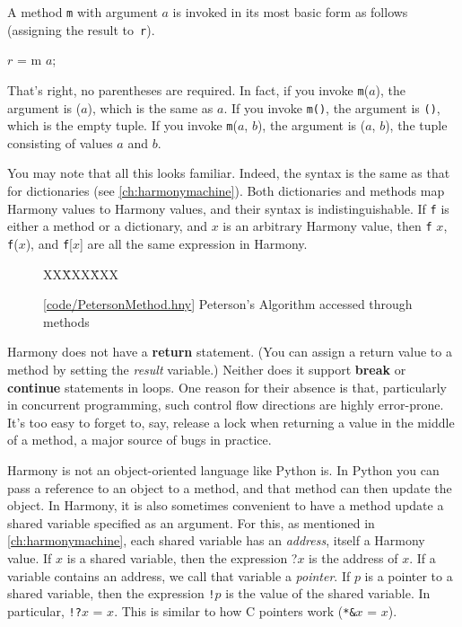 \documentclass{report}
\newcommand{\harmonysource}[1]{
\begin{tabbing}
XX\=XXX\=XXX\kill
    
\end{tabbing}
}
\newcommand{\harmonylink}[1]{%
[\href{https://harmony.cs.cornell.edu/#1}{\underline{#1}}]%
}
\newenvironment{code}{
\tcolorbox
}{
\endtcolorbox
}
\begin{document}
A method \texttt{m} with argument $a$ is invoked in its
most basic form as follows (assigning the result to~\texttt{r}).
\begin{code}
$r$ = m $a$;
\end{code}
That's right, no parentheses are required.  In fact, if you invoke
\texttt{m}($a$), the argument is ($a$), which is the same
as $a$.
If you invoke \texttt{m()}, the argument is \texttt{()},
which is the empty tuple.
If you invoke \texttt{m}($a$, $b$), the argument is ($a$, $b$),
the tuple consisting of values $a$ and $b$.

You may note that all this looks familiar.  Indeed, the syntax
is the same as that for dictionaries (see \autoref{ch:harmonymachine}).
Both dictionaries and methods map Harmony values to Harmony values,
and their syntax is indistinguishable.
If \texttt{f} is either a method or a
dictionary, and $x$ is an arbitrary Harmony value, then
\texttt{f} $x$, \texttt{f}($x$), and \texttt{f}[$x$] are all
the same expression in Harmony.

\begin{figure}
\begin{code}
\harmonysource{PetersonMethod}
\end{code}
\caption{\harmonylink{code/PetersonMethod.hny} Peterson's Algorithm accessed through methods}
\label{fig:petersonmethods}
\end{figure}

Harmony does not have a \textbf{return} statement.  (You can assign a return value
to a method by setting the \textit{result} variable.)  Neither does it support
\textbf{break} or \textbf{continue} statements in loops.  One reason for their absence is
that, particularly in concurrent programming, such control flow directions are highly
error-prone.  It's too easy to forget to, say, release a lock when returning a value in the
middle of a method, a major source of bugs in practice.

Harmony is not an object-oriented language like Python is.  In Python
you can pass a reference to an object to a method, and that method
can then update the object.  In Harmony, it is also sometimes convenient
to have a method update a shared variable specified as an argument.
For this, as mentioned in \autoref{ch:harmonymachine},
each shared variable has an \emph{address}, itself a Harmony value.
%
If $x$ is a shared variable, then the expression ?$x$ is the address of $x$.
If a variable contains an address, we call that variable a \emph{pointer}.
%
If $p$ is a pointer to a shared variable, then the
expression \texttt{!}$p$ is the value of the shared variable.
In particular, \texttt{!?}$x$ = $x$.
This is similar to how C pointers work (\texttt{*\string&}$x$ = $x$).
\end{document}
